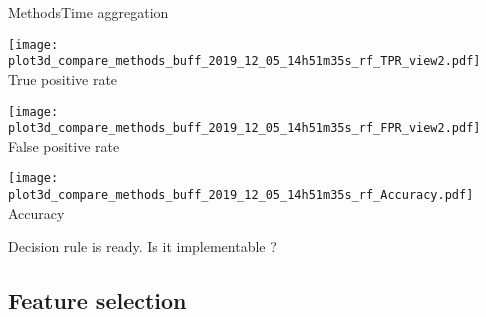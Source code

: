 \begin{frame}{Methods}{Time aggregation}
    
    \vspace{1.0cm}
    \renewcommand{\ratio}{0.32}
    \centering
    \begin{minipage}[t]{0.9\linewidth}
        \centering
        \begin{minipage}[t]{\ratio\linewidth}
            \centering
            \texttt{[image: plot3d\_compare\_methods\_buff\_2019\_12\_05\_14h51m35s\_rf\_TPR\_view2.pdf]}\\
            \smallskip
            {\small True positive rate}
        \end{minipage}
        \begin{minipage}[t]{\ratio\linewidth}
            \centering
            \texttt{[image: plot3d\_compare\_methods\_buff\_2019\_12\_05\_14h51m35s\_rf\_FPR\_view2.pdf]}\\
            \smallskip
            {\small False positive rate}
        \end{minipage}
        \begin{minipage}[t]{\ratio\linewidth}
            \centering
            \texttt{[image: plot3d\_compare\_methods\_buff\_2019\_12\_05\_14h51m35s\_rf\_Accuracy.pdf]}\\
            \smallskip
            {\small Accuracy}
        \end{minipage}
    \end{minipage}
    
    \pause
    \vspace{0.5cm}
    Decision rule is ready. Is it implementable ?

\end{frame}

\subsection{Feature selection}

